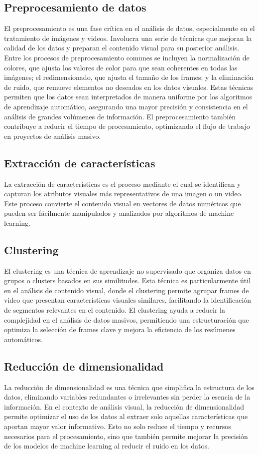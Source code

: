 \subsection{Preprocesamiento de datos}
El preprocesamiento es una fase crítica en el análisis de datos, especialmente en el tratamiento de imágenes y videos. Involucra una serie de técnicas que mejoran la calidad de los datos y preparan el contenido visual para su posterior análisis. Entre los procesos de preprocesamiento comunes se incluyen la normalización de colores, que ajusta los valores de color para que sean coherentes en todas las imágenes; el redimensionado, que ajusta el tamaño de los frames; y la eliminación de ruido, que remueve elementos no deseados en los datos visuales. Estas técnicas permiten que los datos sean interpretados de manera uniforme por los algoritmos de aprendizaje automático, asegurando una mayor precisión y consistencia en el análisis de grandes volúmenes de información. El preprocesamiento también contribuye a reducir el tiempo de procesamiento, optimizando el flujo de trabajo en proyectos de análisis masivo.

\subsection{Extracción de características}
La extracción de características es el proceso mediante el cual se identifican y capturan los atributos visuales más representativos de una imagen o un video. Este proceso convierte el contenido visual en vectores de datos numéricos que pueden ser fácilmente manipulados y analizados por algoritmos de machine learning.

\subsection{Clustering}
El clustering es una técnica de aprendizaje no supervisado que organiza datos en grupos o clusters basados en sus similitudes. Esta técnica es particularmente útil en el análisis de contenido visual, donde el clustering permite agrupar frames de video que presentan características visuales similares, facilitando la identificación de segmentos relevantes en el contenido. El clustering ayuda a reducir la complejidad en el análisis de datos masivos, permitiendo una estructuración que optimiza la selección de frames clave y mejora la eficiencia de los resúmenes automáticos.

\subsection{Reducción de dimensionalidad}
La reducción de dimensionalidad es una técnica que simplifica la estructura de los datos, eliminando variables redundantes o irrelevantes sin perder la esencia de la información. En el contexto de análisis visual, la reducción de dimensionalidad permite optimizar el uso de los datos al extraer solo aquellas características que aportan mayor valor informativo. Esto no solo reduce el tiempo y recursos necesarios para el procesamiento, sino que también permite mejorar la precisión de los modelos de machine learning al reducir el ruido en los datos.


